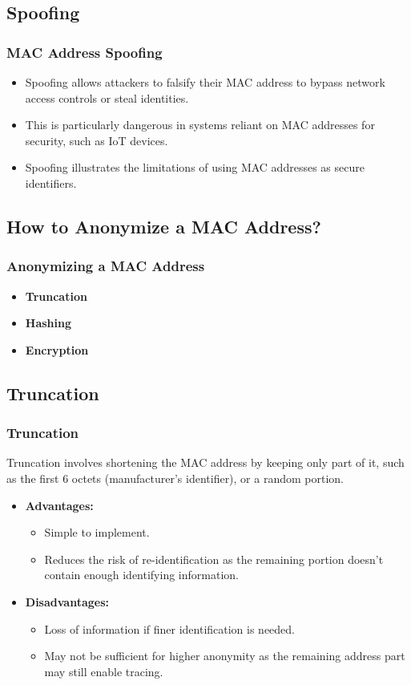 \documentclass[
english,
svgnames,
notes=hide,
12pt]{beamer}
\begin{document}
\begin{frame}
  \section{Spoofing}
  \frametitle{MAC Address Spoofing}
  \begin{itemize}
    \item Spoofing allows attackers to falsify their MAC address to bypass network access controls or steal identities. \pause
    \item This is particularly dangerous in systems reliant on MAC addresses for security, such as IoT devices. \pause
    \item Spoofing illustrates the limitations of using MAC addresses as secure identifiers. 
  \end{itemize}
\end{frame}

\begin{frame}
  \section{How to Anonymize a MAC Address?}
  \frametitle{Anonymizing a MAC Address}
  \begin{itemize}
    \item \textbf{Truncation} \pause
    \item \textbf{Hashing} \pause
    \item \textbf{Encryption} 
  \end{itemize}
\end{frame}

\begin{frame}
  \section{Truncation}
  \frametitle{Truncation}
  Truncation involves shortening the MAC address by keeping only part of it, such as the first 6 octets (manufacturer's identifier), or a random portion.
  \begin{itemize}
    \item \textbf{Advantages:} \pause
      \begin{itemize}
        \item Simple to implement. \pause
        \item Reduces the risk of re-identification as the remaining portion doesn't contain enough identifying information. \pause
      \end{itemize}
    \item \textbf{Disadvantages:} \pause
      \begin{itemize}
        \item Loss of information if finer identification is needed. \pause
        \item May not be sufficient for higher anonymity as the remaining address part may still enable tracing. 
      \end{itemize}
  \end{itemize}
\end{frame}
\end{document}
